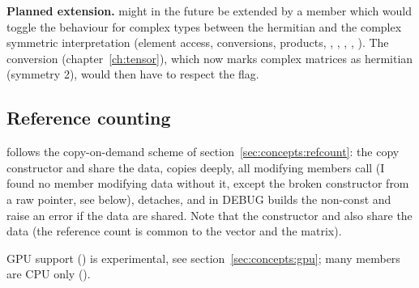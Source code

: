 \textbf{Planned extension.}  might in the future be extended by a  member 
which would toggle the behaviour for complex types between the hermitian and the complex symmetric interpretation
(element access, conversions, products, , , , , ).
The conversion  (chapter~\ref{ch:tensor}), which now marks complex matrices as hermitian (symmetry 2),
would then have to respect the flag.

\subsection{Reference counting}
 follows the copy-on-demand scheme of section~\ref{sec:concepts:refcount}: the copy
constructor and  share the data,  copies deeply, all modifying members
call  (I found no member modifying data without it, except the broken constructor
from a raw pointer, see below),  detaches, and in DEBUG builds the non-const
 and  raise an error if the data are shared.
Note that the constructor  and 
also share the data (the reference count is common to the vector and the matrix).

GPU support () is experimental, see section~\ref{sec:concepts:gpu}; many members
are CPU only ().


